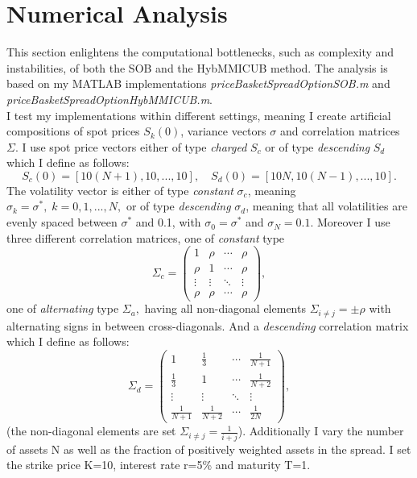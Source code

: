 \documentclass[a4paper]{article}
\begin{document}
\newpage
\section{Numerical Analysis}
\label{sec:na}
This section enlightens the computational bottlenecks, such as complexity and instabilities, of both the SOB and the HybMMICUB method. The analysis is based on my MATLAB implementations \emph{priceBasketSpreadOptionSOB.m} and \emph{priceBasketSpreadOptionHybMMICUB.m}.\\
I test my implementations within different settings, meaning I create artificial compositions of spot prices $S_k(0)$, variance vectors $\sigma$ and correlation matrices $\Sigma$. I use spot price vectors either of type \emph{charged} $S_c$ or of type \emph{descending} $S_d$ which I define as follows: 
$$S_{c}(0) = [10(N+1), 10, ..., 10],\quad S_{d}(0) = [10N, 10(N-1), ..., 10].$$  
The volatility vector is either of type \emph{constant} $\sigma_c$, meaning $\sigma_k = \sigma^*,\;k=0,1,...,N,$ or of  type \emph{descending} $\sigma_d$, meaning that all volatilities are evenly spaced between $\sigma^*$ and 0.1, with $\sigma_0 = \sigma^*$ and $\sigma_N = 0.1$.
Moreover I use three different correlation matrices, one of \emph{constant} type
$$\Sigma_{c} =\begin{pmatrix}1 & \rho & \cdots & \rho \\ \rho & 1 & \cdots & \rho \\ \vdots & \vdots & \ddots & \vdots \\ \rho & \rho & \cdots & \rho \end{pmatrix}  ,$$
one of \emph{alternating} type $\Sigma_{a},$ having all non-diagonal elements $\Sigma_{i\neq j} = \pm \rho$ with alternating signs in between cross-diagonals. And a \emph{descending} correlation matrix which I define as follows:
$$\Sigma_{d} = \begin{pmatrix}1 & \frac{1}{3} & \cdots & \frac{1}{N+1} \\ \frac{1}{3} & 1 & \cdots & \frac{1}{N+2} \\ \vdots & \vdots & \ddots & \vdots \\ \frac{1}{N+1} & \frac{1}{N+2} & \cdots & \frac{1}{2N} \end{pmatrix},$$
(the non-diagonal elements are set  $\Sigma_{i\neq j} = \frac{1}{i+j}$).
Additionally I vary the number of assets N as well as the fraction of positively weighted assets in the spread. I set the strike price K=10, interest rate  r=5\% and maturity T=1. 
\end{document}
